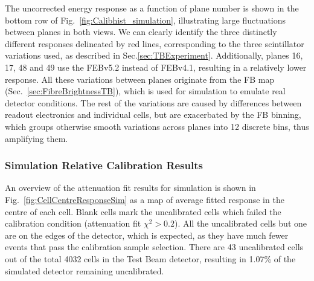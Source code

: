 The uncorrected energy response as a function of plane number is shown in the bottom row of Fig.~\ref{fig:Calibhist_simulation}, illustrating large fluctuations between planes in both views. We can clearly identify the three distinctly different responses delineated by red lines, corresponding to the three scintillator variations used, as described in Sec.\ref{sec:TBExperiment}. Additionally, planes 16, 17, 48 and 49 use the \gls{FEB}v5.2 instead of \gls{FEB}v4.1, resulting in a relatively lower response. All these variations between planes originate from the \gls{FB} map (Sec.~\ref{sec:FibreBrightnessTB}),  which is used for simulation to emulate real detector conditions. The rest of the variations are caused by differences between readout electronics and individual cells, but are exacerbated by the \gls{FB} binning, which groups otherwise smooth variations across planes into 12 discrete bins, thus amplifying them. 

\subsubsection*{Simulation Relative Calibration Results}

An overview of the attenuation fit results for simulation is shown in Fig.~\ref{fig:CellCentreResponseSim} as a map of average fitted response in the centre of each cell. Blank cells mark the uncalibrated cells which failed the calibration condition (attenuation fit $\chi^2>0.2$). All the uncalibrated cells but one are on the edges of the detector, which is expected, as they have much fewer events that pass the calibration sample selection. There are 43 uncalibrated cells out of the total 4032 cells in the Test Beam detector, resulting in 1.07\% of the simulated detector remaining uncalibrated.


